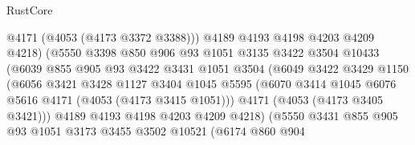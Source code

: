 \begin{lexlean}{RustCore}
\begin{coremodule}
                                @4171
                                (@4053 (@4173 @3372 @3388)))
                              @4189
                              @4193
                              @4198
                              @4203
                              @4209
                              @4218)
                            (@5550
                              @3398
                              @850
                              @906
                              @93
                              @1051
                              @3135
                              @3422
                              @3504
                              @10433
                              (@6039
                                @855
                                @905
                                @93
                                @3422
                                @3431
                                @1051
                                @3504
                                (@6049
                                  @3422
                                  @3429
                                  @1150
                                  (@6056
                                    @3421
                                    @3428
                                    @1127
                                    @3404
                                    @1045
                                    @5595
                                    (@6070
                                      @3414
                                      @1045
                                      @6076
                                      @5616
                                      @4171
                                      (@4053 (@4173 @3415 @1051)))
                                    @4171
                                    (@4053 (@4173 @3405 @3421)))
                                  @4189
                                  @4193
                                  @4198
                                  @4203
                                  @4209
                                  @4218)
                                (@5550
                                  @3431
                                  @855
                                  @905
                                  @93
                                  @1051
                                  @3173
                                  @3455
                                  @3502
                                  @10521
                                  (@6174
                                    @860
                                    @904

\end{coremodule}
\end{lexlean}
